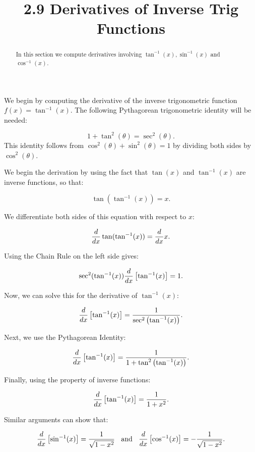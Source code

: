 \documentclass[handout]{ximera}
\title{2.9 Derivatives of Inverse Trig Functions}
\begin{document}
\begin{abstract}
In this section we compute derivatives involving $\tan^{-1}(x), \sin^{-1}(x)$ and $\cos^{-1}(x)$.
\end{abstract}

\maketitle


We begin by computing the derivative of the inverse trigonometric function $f(x) = \tan^{-1}(x)$.  
The following Pythagorean trigonometric identity will be needed:


\[
1 + \tan^2(\theta) = \sec^2(\theta).
\]
This identity follows from $\cos^2(\theta) + \sin^2(\theta) = 1$ by dividing both sides by $\cos^2(\theta)$.

We begin the derivation by using the fact that $\tan(x)$ and $\tan^{-1}(x)$ are inverse functions, so that:

\[
\tan(\tan^{-1}(x)) = x.
\]

We differentiate both sides of this equation with respect to $x$:

\[
\frac{\mathop{}\!d }{\mathop{}\!d x} \tan(\tan^{-1}(x)) = \frac{d}{\mathop{}\!d x} x.
\]

Using the Chain Rule on the left side gives:

\[
\sec^2(\tan^{-1}(x)) \frac{d}{\mathop{}\!d x} \left[\tan^{-1}(x)\right] = 1.
\]

Now, we can solve this for the derivative of $\tan^{-1}(x)$:

\[
 \frac{d}{\mathop{}\!d x} \left[\tan^{-1}(x)\right] = \frac{1}{\sec^2\left(\tan^{-1}(x)\right)}.
\]

Next, we use the Pythagorean Identity:

\[
 \frac{d}{\mathop{}\!d x} \left[\tan^{-1}(x)\right] = \frac{1}{1 + \tan^2\left(\tan^{-1}(x)\right)}.
\]

Finally, using the property of inverse functions:

\[
 \frac{d}{\mathop{}\!d x} \left[\tan^{-1}(x)\right] = \frac{1}{1 + x^2}.
\]


Similar arguments can show that:

\[
 \frac{d}{\mathop{}\!d x} \left[\sin^{-1}(x)\right] = \frac{1}{\sqrt{1 - x^2}} \;\;\text{  and  } \;\;\frac{d}{\mathop{}\!d x} \left[\cos^{-1}(x)\right] = -\frac{1}{\sqrt{1 - x^2}}.
\]



\begin{foldable}
\end{foldable}
\end{document}
